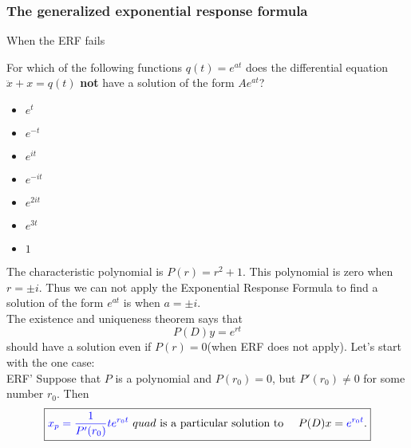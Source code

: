 \clearpage
\subsubsection{The generalized exponential response formula}

\begin{exercise}
  When the ERF fails
\end{exercise}
For which of the following functions $q\left(t\right)=e^{at}$ does the differential equation
$\ddot{x}+x = q(t)$ \textbf{not} have a solution of the form $Ae^{at}$?

\begin{itemize}
\item $e^t$
\item $e^{-t}$
\item $e^{it}$
\item $e^{-it}$
\item $e^{2it}$
\item $e^{3t}$
\item $1$
\end{itemize}
The characteristic polynomial is $P(r) = r^2+1$.
This polynomial is zero when $r=\pm i$.
Thus we can not apply the Exponential Response Formula to find a solution of the form
$e^{at}$ is when $a=\pm i$.\\

The existence and uniqueness theorem says that
\begin{equation*}
  P(D) y = e^{rt}
\end{equation*}
should have a solution even if $P(r) = 0$(when ERF does not apply). Let's start with the one case:\\
{\color{blue} ERF'} Suppose that $P$ is a polynomial and $P(r _0) = 0$, but
$P'(r _0) \neq 0$ for some number $r_0$. Then
\begin{equation*}
  \boxed {{\color{blue}{x_ p=\frac{1}{P'(r_0)} t e^{r_0t}}}  \
    quad \text { is a particular solution to }\quad P(D) x = {\color{blue}{e^{r_0t}}} .}
\end{equation*}

